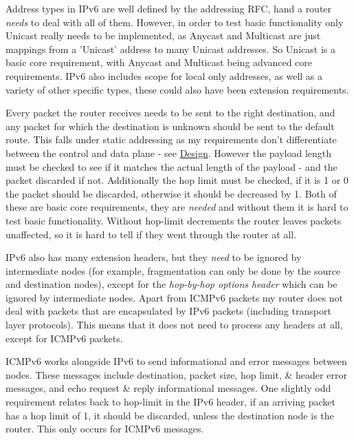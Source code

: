 \documentclass[12pt,a4paper,twoside,openright]{report}
\begin{document}
Address types in IPv6 are well defined by the addressing RFC\cite{ipv6_rfc_adr}, hand a router \textit{needs} to deal with all of them.  However, in order to test basic functionality only Unicast really needs to be implemented, as Anycast and Multicast are just mappings from a 'Unicast' address to many Unicast addresses. So Unicast is a basic core requirement, with Anycast and Multicast being advanced core requirements. IPv6 also includes scope for local only addresses, as well as a variety of other specific types, these could also have been extension requirements.

\bigskip

Every packet the router receives needs to be sent to the right destination, and any packet for which the destination is unknown should be sent to the default route. This falls under static addressing as my requirements don't differentiate between the control and data plane - see \hyperref[sec::design]{Design}.  However the payload length must be checked to see if it matches the actual length of the payload - and the packet discarded if not.  Additionally the hop limit must be checked, if it is 1 or 0 the packet should be discarded, otherwise it should be decreased by 1.  Both of these are basic core requirements, they are \textit{needed} and without them it is hard to test basic functionality. Without hop-limit decrements the router leaves packets unaffected, so it is hard to tell if they went through the router at all.

IPv6 also has many extension headers, but they \textit{need} to be ignored by intermediate nodes (for example, fragmentation can only be done by the source and destination nodes), except for the \textit{hop-by-hop options header} which can be ignored by intermediate nodes. Apart from ICMPv6 packets my router does not deal with packets that are encapsulated by IPv6 packets (including transport layer protocols).  This means that it does not need to process any headers at all, except for ICMPv6 packets.

\bigskip

ICMPv6 works alongside IPv6 to send informational and error messages between nodes.  These messages include destination, packet size, hop limit, \& header error messages, and echo request \& reply informational messages. One slightly odd requirement relates back to hop-limit in the IPv6 header, if an arriving packet has a hop limit of 1, it should be discarded, unless the destination node is the router.  This only occurs for ICMPv6 messages. 
\end{document}
